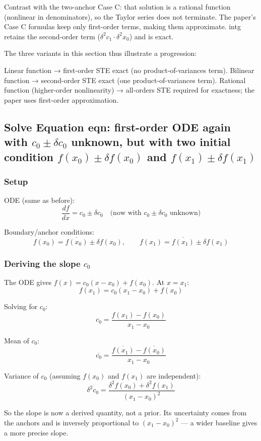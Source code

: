\documentclass[twoside]{article}
\numberwithin{equation}{section}
\begin{document}
Contrast with the two-anchor Case C: that solution is a rational function (nonlinear in denominators), so the Taylor series does not terminate. The paper's Case C formulas keep only first-order terms, making them approximate. intg retains the second-order term ($\delta^2 c_1 \cdot \delta^2 x_0$) and is exact.

The three variants in this section thus illustrate a progression:

Linear function → first-order STE exact (no product-of-variances term).
Bilinear function → second-order STE exact (one product-of-variances term).
Rational function (higher-order nonlinearity) → all-orders STE required for exactness; the paper uses first-order approximation.


\subsection{Solve Equation {eqn: first-order ODE} again with $c_0 \pm \delta c_0$ unknown, but with two initial condition $f(x_0) \pm \delta f(x_0)$ and $f(x_1) \pm \delta f(x_1)$}

\subsubsection{Setup}
ODE (same as before):
$$\frac{df}{dx} = c_0 \pm \delta c_0 \quad \text{(now with $c_0 \pm \delta c_0$ unknown)}$$

Boundary/anchor conditions:
$$f(x_0) = \overline{f(x_0)} \pm \delta f(x_0), \qquad f(x_1) = \overline{f(x_1)} \pm \delta f(x_1)$$

\subsubsection{Deriving the slope $c_0$}
The ODE gives $f(x) = c_0(x - x_0) + f(x_0)$. At $x = x_1$:
$$f(x_1) = c_0(x_1 - x_0) + f(x_0)$$

Solving for $c_0$:
$$\boxed{c_0 = \frac{f(x_1) - f(x_0)}{x_1 - x_0}}$$

Mean of $c_0$:
$$\overline{c_0} = \frac{\overline{f(x_1)} - \overline{f(x_0)}}{x_1 - x_0}$$

Variance of $c_0$ (assuming $f(x_0)$ and $f(x_1)$ are independent):
$$\delta^2 c_0 = \frac{\delta^2 f(x_0) + \delta^2 f(x_1)}{(x_1 - x_0)^2}$$

So the slope is now a derived quantity, not a prior. Its uncertainty comes from the anchors and is inversely proportional to $(x_1 - x_0)^2$ — a wider baseline gives a more precise slope.
\end{document}
